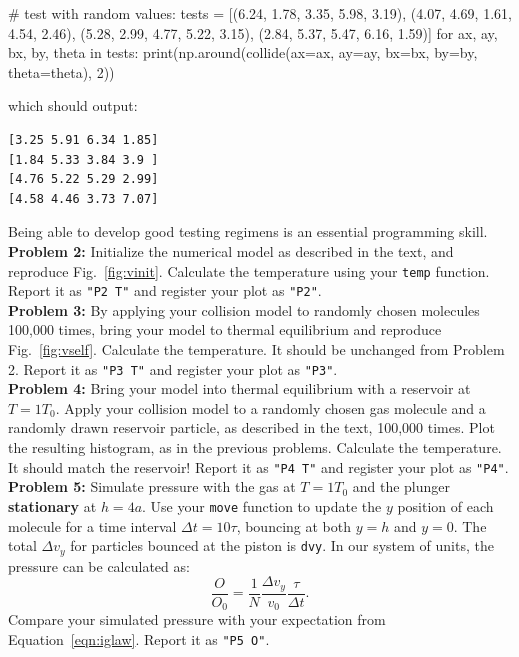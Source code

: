 \documentclass[12pt]{article}
\begin{document}
\begin{python}
# test with random values:
tests = [(6.24, 1.78, 3.35, 5.98, 3.19), (4.07, 4.69, 1.61, 4.54, 2.46),
         (5.28, 2.99, 4.77, 5.22, 3.15), (2.84, 5.37, 5.47, 6.16, 1.59)]
for ax, ay, bx, by, theta in tests:
    print(np.around(collide(ax=ax, ay=ay, bx=bx, by=by, theta=theta), 2))
\end{python}
which should output:
\begin{verbatim}
[3.25 5.91 6.34 1.85]
[1.84 5.33 3.84 3.9 ]
[4.76 5.22 5.29 2.99]
[4.58 4.46 3.73 7.07]
\end{verbatim}
Being able to develop good testing regimens is an essential programming skill.\\[3pt] 


\noindent
{\bf Problem 2:} Initialize the numerical model as described in the text, and reproduce Fig.~\ref{fig:vinit}.  Calculate the temperature using your {\tt temp} function.
Report it as {\tt "P2 T"} and register your plot as {\tt "P2"}.\\[3pt]

\noindent
{\bf Problem 3:} By applying your collision model to randomly chosen molecules 100,000 times, bring your model to thermal equilibrium and reproduce Fig.~\ref{fig:vself}. Calculate the temperature.  It should be unchanged from Problem 2.
Report it as {\tt "P3 T"} and register your plot as {\tt "P3"}.\\[3pt]

\noindent
{\bf Problem 4:}  Bring your model into thermal equilibrium with a reservoir at $T = 1 T_0$.
Apply your collision model to a randomly chosen gas molecule and a randomly drawn reservoir particle, as described in the text, 100,000 times.  Plot the resulting histogram, as in the previous problems.  Calculate the temperature.  It should match the reservoir!
Report it as {\tt "P4 T"} and register your plot as {\tt "P4"}.\\[3pt]

\noindent
{\bf Problem 5:}
Simulate pressure with the gas at $T = 1 T_0$ and the plunger {\bf
  stationary} at $h=4a$.  Use your {\tt move} function to update the $y$
position of each molecule for a time interval $\Delta t = 10 \tau$,
bouncing at both $y=h$ and $y=0$.  The total $\Delta v_y$ for particles
bounced at the piston is {\tt dvy}.  In our system of units, the pressure
can be calculated as:
$$\frac{O}{O_0} = \frac{1}{N}\frac{\Delta v_y}{v_0} \frac{\tau}{\Delta t}.$$
Compare your simulated pressure with your expectation from
Equation~\ref{eqn:iglaw}.  Report it as {\tt "P5 O"}.
\end{document}
